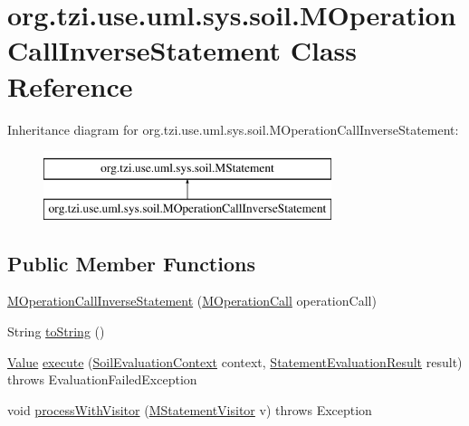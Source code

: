\hypertarget{classorg_1_1tzi_1_1use_1_1uml_1_1sys_1_1soil_1_1_m_operation_call_inverse_statement}{\section{org.\-tzi.\-use.\-uml.\-sys.\-soil.\-M\-Operation\-Call\-Inverse\-Statement Class Reference}
\label{classorg_1_1tzi_1_1use_1_1uml_1_1sys_1_1soil_1_1_m_operation_call_inverse_statement}
}
Inheritance diagram for org.\-tzi.\-use.\-uml.\-sys.\-soil.\-M\-Operation\-Call\-Inverse\-Statement\-:\begin{figure}[H]
\begin{center}
\leavevmode
\includegraphics[height=2.000000cm]{classorg_1_1tzi_1_1use_1_1uml_1_1sys_1_1soil_1_1_m_operation_call_inverse_statement}
\end{center}
\end{figure}
\subsection*{Public Member Functions}
\begin{DoxyCompactItemize}
\item 
\hyperlink{classorg_1_1tzi_1_1use_1_1uml_1_1sys_1_1soil_1_1_m_operation_call_inverse_statement_a77b5b59f9abb9c922fb9db90689dd503}{M\-Operation\-Call\-Inverse\-Statement} (\hyperlink{classorg_1_1tzi_1_1use_1_1uml_1_1sys_1_1_m_operation_call}{M\-Operation\-Call} operation\-Call)
\item 
String \hyperlink{classorg_1_1tzi_1_1use_1_1uml_1_1sys_1_1soil_1_1_m_operation_call_inverse_statement_a0e1458d3906f0a1b39d70c01bbf29be4}{to\-String} ()
\item 
\hyperlink{classorg_1_1tzi_1_1use_1_1uml_1_1ocl_1_1value_1_1_value}{Value} \hyperlink{classorg_1_1tzi_1_1use_1_1uml_1_1sys_1_1soil_1_1_m_operation_call_inverse_statement_afabc5fcc6049e29c8c42e12325a085de}{execute} (\hyperlink{classorg_1_1tzi_1_1use_1_1uml_1_1sys_1_1soil_1_1_soil_evaluation_context}{Soil\-Evaluation\-Context} context, \hyperlink{classorg_1_1tzi_1_1use_1_1uml_1_1sys_1_1_statement_evaluation_result}{Statement\-Evaluation\-Result} result)  throws Evaluation\-Failed\-Exception 
\item 
void \hyperlink{classorg_1_1tzi_1_1use_1_1uml_1_1sys_1_1soil_1_1_m_operation_call_inverse_statement_a7236e4ca0d232029d791168de47afe15}{process\-With\-Visitor} (\hyperlink{interfaceorg_1_1tzi_1_1use_1_1uml_1_1sys_1_1soil_1_1_m_statement_visitor}{M\-Statement\-Visitor} v)  throws Exception 
\end{DoxyCompactItemize}
